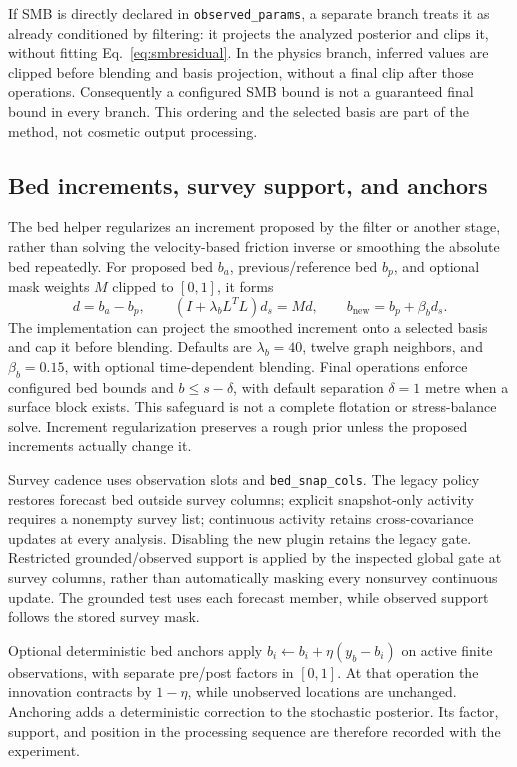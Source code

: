 \documentclass[11pt,a4paper]{article}
\newcommand{\code}[1]{\nolinkurl{#1}}
\begin{document}
If SMB is directly declared in \code{observed_params}, a separate branch treats it as already conditioned by filtering: it projects the analyzed posterior and clips it, without fitting Eq.~\ref{eq:smbresidual}. In the physics branch, inferred values are clipped before blending and basis projection, without a final clip after those operations. Consequently a configured SMB bound is not a guaranteed final bound in every branch. This ordering and the selected basis are part of the method, not cosmetic output processing.

\subsection{Bed increments, survey support, and anchors}
The bed helper regularizes an increment proposed by the filter or another stage, rather than solving the velocity-based friction inverse or smoothing the absolute bed repeatedly. For proposed bed \(b_a\), previous/reference bed \(b_p\), and optional mask weights \(M\) clipped to \([0,1]\), it forms
\begin{equation}
 d=b_a-b_p,\qquad (I+\lambda_bL^TL)d_s=Md,
 \qquad b_{\mathrm{new}}=b_p+\beta_b d_s.
 \label{eq:bedregularization}
\end{equation}
The implementation can project the smoothed increment onto a selected basis and cap it before blending. Defaults are \(\lambda_b=40\), twelve graph neighbors, and \(\beta_b=0.15\), with optional time-dependent blending. Final operations enforce configured bed bounds and \(b\leq s-\delta\), with default separation \(\delta=1\) metre when a surface block exists. This safeguard is not a complete flotation or stress-balance solve. Increment regularization preserves a rough prior unless the proposed increments actually change it.

Survey cadence uses observation slots and \code{bed_snap_cols}. The legacy policy restores forecast bed outside survey columns; explicit snapshot-only activity requires a nonempty survey list; continuous activity retains cross-covariance updates at every analysis. Disabling the new plugin retains the legacy gate. Restricted grounded/observed support is applied by the inspected global gate at survey columns, rather than automatically masking every nonsurvey continuous update. The grounded test uses each forecast member, while observed support follows the stored survey mask.

Optional deterministic bed anchors apply \(b_i\leftarrow b_i+\eta(y_b-b_i)\) on active finite observations, with separate pre/post factors in \([0,1]\). At that operation the innovation contracts by \(1-\eta\), while unobserved locations are unchanged. Anchoring adds a deterministic correction to the stochastic posterior. Its factor, support, and position in the processing sequence are therefore recorded with the experiment.
\end{document}
